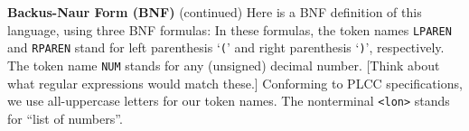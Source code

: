 \begin{minipage}[t]{\sw}
\slidenumber
\LARGE
{\bf Backus-Naur Form (BNF)} (continued)\exx
Here is a BNF definition of this language,
using three BNF formulas:\exx
\emm\NormalBox{\MYlon}\exx
In these formulas, the token names
\verb'LPAREN' and \verb'RPAREN' stand
for left parenthesis `\verb'(''
and right parenthesis `\verb')'', respectively.
The token name \verb'NUM' stands for any (unsigned) decimal number.
[Think about what regular expressions would match these.]
Conforming to PLCC specifications,
we use all-uppercase letters for our token names.\exx
The nonterminal \verb'<lon>' stands for ``list of numbers''.
\end{minipage}
\clearpage
